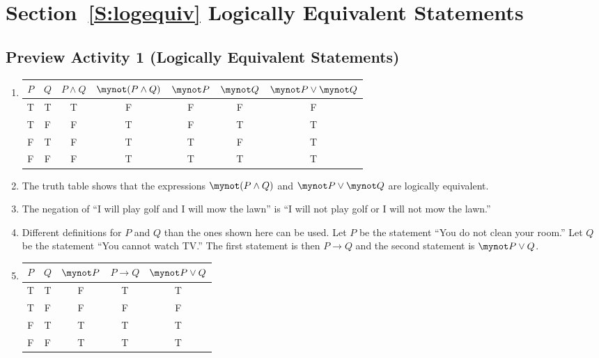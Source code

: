 \section*{Section~\ref{S:logequiv} Logically Equivalent Statements}

\subsection*{Preview Activity 1 (Logically Equivalent Statements)}
\begin{enumerate}

\item 
\begin{tabular}[t]{| c | c || c | c | c | c | c |}  \hline
$P$  &  $Q$  &  $P \wedge Q$  &  $\mynot  ( {P \wedge Q} )$  &  $\mynot P$  &  
$\mynot Q$  &  $\mynot  P \vee \mynot  Q$ \\ \hline
T  &  T  &  T  &  F  &  F  &  F  &  F  \\ \hline
T  &  F  &  F  &  T  &  F  &  T  &  T  \\ \hline
F  &  T  &  F  &  T  &  T  &  F  &  T  \\ \hline
F  &  F  &  F  &  T  &  T  &  T  &  T  \\ \hline
\end{tabular}

\item The truth table shows that the expressions $\mynot  ( {P \wedge Q} )$ and 
$\mynot  P \vee \mynot  Q$ are logically equivalent.

\item The negation of ``I will play golf and I will mow the lawn'' is ``I will not play golf or I will not mow the lawn.''

\item Different definitions for  $P$ and  $Q$  than the ones shown here can be used.
Let  $P$  be the statement ``You do not clean your room.''  Let  $Q$  be the statement  ``You cannot watch TV.''
The first statement is then $P \to Q$  and the second statement is  $\mynot P \vee Q$. 
\item 
\begin{tabular}[t]{| c | c || c | c | c |}  \hline
$P$  &  $Q$  &  $\mynot P$  &  $P \to Q$  &  $\mynot P \vee Q$ \\ \hline
T  &  T  &  F  &  T  &  T  \\ \hline
T  &  F  &  F  &  F  &  F  \\ \hline
F  &  T  &  T  &  T  &  T  \\ \hline
F  &  F  &  T  &  T  &  T  \\ \hline
\end{tabular}


\end{enumerate}
